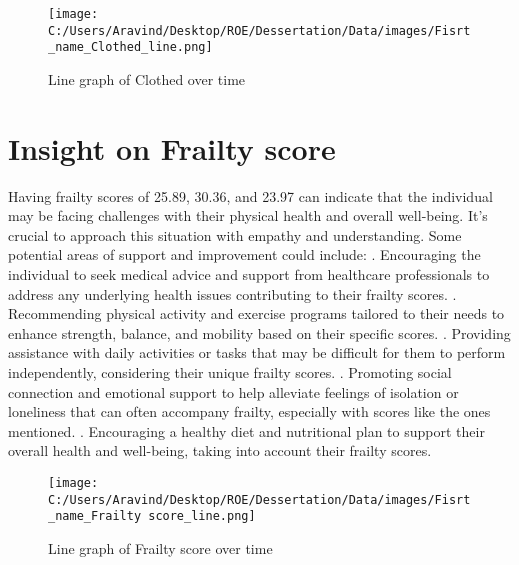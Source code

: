 \documentclass[10pt, a4paper]{article}%
\begin{document}
\begin{figure}[H]%
\centering%
\texttt{[image: C:/Users/Aravind/Desktop/ROE/Dessertation/Data/images/Fisrt\_name\_Clothed\_line.png]}%
\caption{Line graph of Clothed over time}%
\end{figure}

%
\section{Insight on Frailty score}%
\label{sec:InsightonFrailtyscore}%
Having frailty scores of 25.89, 30.36, and 23.97 can indicate that the individual may be facing challenges with their physical health and overall well{-}being. It's crucial to approach this situation with empathy and understanding.\newline%
\newline%
Some potential areas of support and improvement could include:\newline%
. Encouraging the individual to seek medical advice and support from healthcare professionals to address any underlying health issues contributing to their frailty scores.\newline%
. Recommending physical activity and exercise programs tailored to their needs to enhance strength, balance, and mobility based on their specific scores.\newline%
. Providing assistance with daily activities or tasks that may be difficult for them to perform independently, considering their unique frailty scores.\newline%
. Promoting social connection and emotional support to help alleviate feelings of isolation or loneliness that can often accompany frailty, especially with scores like the ones mentioned.\newline%
. Encouraging a healthy diet and nutritional plan to support their overall health and well{-}being, taking into account their frailty scores.%


\begin{figure}[H]%
\centering%
\texttt{[image: C:/Users/Aravind/Desktop/ROE/Dessertation/Data/images/Fisrt\_name\_Frailty score\_line.png]}%
\caption{Line graph of Frailty score over time}%
\end{figure}
\end{document}
